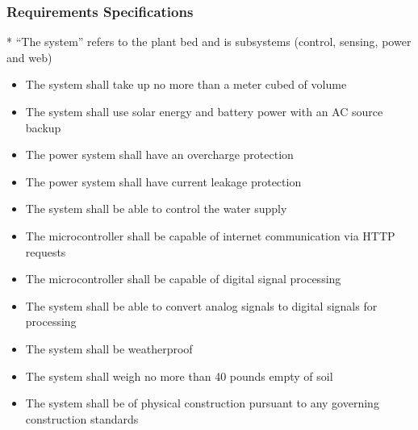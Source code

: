 \subsubsection{Requirements Specifications}
* ``The system'' refers to the plant bed and is subsystems (control, sensing, power and web)
\begin{itemize}
  \item The system shall take up no more than a meter cubed of volume
  \item The system shall use solar energy and battery power with an AC source backup
  \item The power system shall have an overcharge protection
  \item The power system shall have current leakage protection
  \item The system shall be able to control the water supply
  \item The microcontroller shall be capable of internet communication via HTTP requests
  \item The microcontroller shall be capable of digital signal processing
  \item The system shall be able to convert analog signals to digital signals for processing
  \item The system shall be weatherproof
  \item The system shall weigh no more than 40 pounds empty of soil
  \item The system shall be of physical construction pursuant to any governing construction standards
\end{itemize}